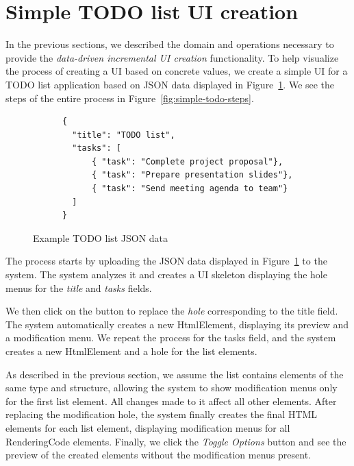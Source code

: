 \section{Simple TODO list UI creation}
\label{sec:simple-todo}
In the previous sections, we described the domain and operations necessary to provide the \emph{data-driven incremental UI creation} functionality.
To help visualize the process of creating a UI based on concrete values, we create a simple UI for a TODO list application based on JSON data displayed in Figure~\ref{fig:simple-todo-json}.
We see the steps of the entire process in Figure~\ref{fig:simple-todo-steps}.
\begin{figure}[htbp]
	\centering
	\begin{lstlisting} 
      {
        "title": "TODO list",
        "tasks": [
            { "task": "Complete project proposal"},
            { "task": "Prepare presentation slides"},
            { "task": "Send meeting agenda to team"}
        ]
      }
    \end{lstlisting}
	\caption{Example TODO list JSON data}
	\label{fig:simple-todo-json}
\end{figure}

The process starts by uploading the JSON data displayed in Figure~\ref{fig:simple-todo-json} to the system.
The system analyzes it and creates a UI skeleton displaying the hole menus for the \emph{title} and \emph{tasks} fields.

We then click on the button to replace the \emph{hole} corresponding to the title field. The system automatically creates a new HtmlElement, displaying its preview and a modification menu.
We repeat the process for the tasks field, and the system creates a new HtmlElement and a hole for the list elements.

As described in the previous section, we assume the list contains elements of the same type and structure, allowing the system to show modification menus only for the first list element. All changes made to it affect all other elements.
After replacing the modification hole, the system finally creates the final HTML elements for each list element, displaying modification menus for all RenderingCode elements.
Finally, we click the \emph{Toggle Options} button and see the preview of the created elements without the modification menus present.


